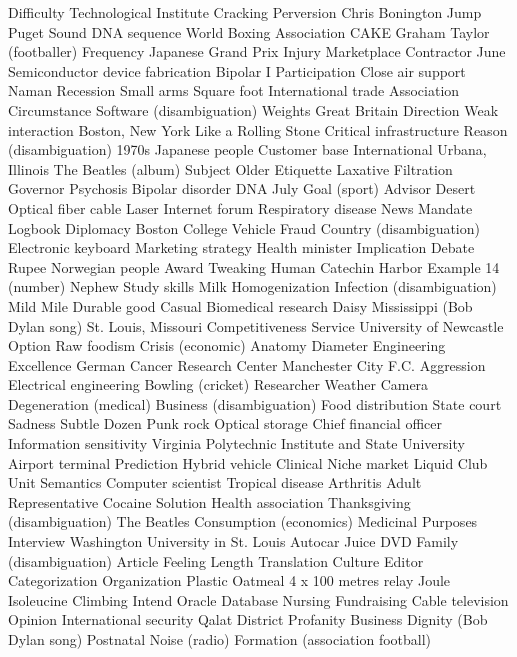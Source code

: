 Difficulty  Technological Institute  Cracking  
Perversion  Chris Bonington  Jump  
Puget Sound  DNA sequence  World Boxing Association  
CAKE  Graham Taylor (footballer)  Frequency  
Japanese Grand Prix  Injury  Marketplace  
Contractor  June  Semiconductor device fabrication  
Bipolar I  Participation  Close air support  
Naman  Recession  Small arms  
Square foot  International trade  Association  
Circumstance  Software (disambiguation)  Weights  
Great Britain  Direction  Weak interaction  
Boston, New York  Like a Rolling Stone  Critical infrastructure  
Reason (disambiguation)  1970s  Japanese people  
Customer base  International  Urbana, Illinois  
The Beatles (album)  Subject  Older  
Etiquette  Laxative  Filtration  
Governor  Psychosis  Bipolar disorder  
DNA  July  Goal (sport)  
Advisor  Desert  Optical fiber cable  
Laser  Internet forum  Respiratory disease  
News  Mandate  Logbook  
Diplomacy  Boston College  Vehicle  
Fraud  Country (disambiguation)  Electronic keyboard  
Marketing strategy  Health minister  Implication  
Debate  Rupee  Norwegian people  
Award  Tweaking  Human  
Catechin  Harbor  Example  
14 (number)  Nephew  Study skills  
Milk  Homogenization  Infection (disambiguation)  
Mild  Mile  Durable good  
Casual  Biomedical research  Daisy  
Mississippi (Bob Dylan song)  St. Louis, Missouri  Competitiveness  
Service  University of Newcastle  Option  
Raw foodism  Crisis (economic)  Anatomy  
Diameter  Engineering  Excellence  
German Cancer Research Center  Manchester City F.C.  Aggression  
Electrical engineering  Bowling (cricket)  Researcher  
Weather  Camera  Degeneration (medical)  
Business (disambiguation)  Food distribution  State court  
Sadness  Subtle  Dozen  
Punk rock  Optical storage  Chief financial officer  
Information sensitivity  Virginia Polytechnic Institute and State University  Airport terminal  
Prediction  Hybrid vehicle  Clinical  
Niche market  Liquid  Club  
Unit  Semantics  Computer scientist  
Tropical disease  Arthritis  Adult  
Representative  Cocaine  Solution  
Health association  Thanksgiving (disambiguation)  The Beatles  
Consumption (economics)  Medicinal Purposes  Interview  
Washington University in St. Louis  Autocar  Juice  
DVD  Family (disambiguation)  Article  
Feeling  Length  Translation  
Culture  Editor  Categorization  
Organization  Plastic  Oatmeal  
4 x 100 metres relay  Joule  Isoleucine  
Climbing  Intend  Oracle Database  
Nursing  Fundraising  Cable television  
Opinion  International security  Qalat District  
Profanity  Business  Dignity (Bob Dylan song)  
Postnatal  Noise (radio)  Formation (association football)  
